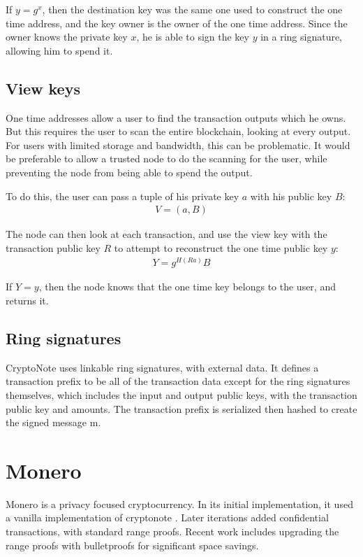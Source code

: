 \documentclass{article}
\begin{document}
If $y = g^x$, then the destination key was the same one used to construct the one time address, and the key owner is the owner of the one time address.  Since the owner knows the private key $x$, he is able to sign the key $y$ in a ring signature, allowing him to spend it.


\subsection{View keys}

One time addresses allow a user to find the transaction outputs which he owns.  But this requires the user to scan the entire blockchain, looking at every output.  For users with limited storage and bandwidth, this can be problematic.  It would be preferable to allow a trusted node to do the scanning for the user, while preventing the node from being able to spend the output.

To do this, the user can pass a tuple of his private key $a$ with his public key $B$:
\begin{align}
  V = (a, B)
\end{align}

The node can then look at each transaction, and use the view key with the transaction public key $R$ to attempt to reconstruct the one time public key $y$:
\begin{align}
  Y = g^{H(Ra)} B
\end{align}

If $Y = y$, then the node knows that the one time key belongs to the user, and returns it.


\subsection{Ring signatures}

CryptoNote uses linkable ring signatures, with external data.  It defines a transaction prefix to be all of the transaction data except for the ring signatures themselves, which includes the input and output public keys, with the transaction public key and amounts.  The transaction prefix is serialized then hashed to create the signed message m.



\section{Monero}

Monero is a privacy focused cryptocurrency.  In its initial implementation, it used a vanilla implementation of cryptonote \cite{cryptonote}.  Later iterations added confidential transactions, with standard range proofs.  Recent work includes upgrading the range proofs with bulletproofs for significant space savings.
\end{document}
